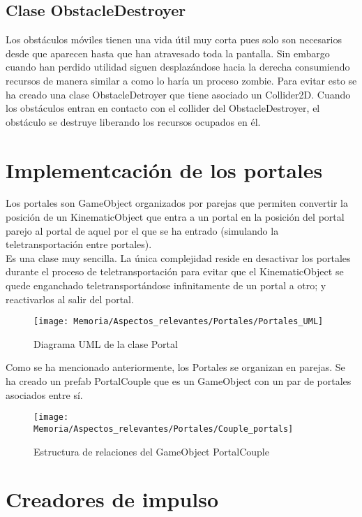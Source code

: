 \subsection{Clase ObstacleDestroyer}
Los obstáculos móviles tienen una vida útil muy corta pues solo son necesarios desde que aparecen hasta que han atravesado toda la pantalla. Sin embargo cuando han perdido utilidad siguen desplazándose hacia la derecha consumiendo recursos de manera similar a como lo haría un proceso zombie. Para evitar esto se ha creado una clase ObstacleDetroyer que tiene asociado un Collider2D. Cuando los obstáculos entran en contacto con el collider del ObstacleDestroyer, el obstáculo se destruye liberando los recursos ocupados en él.

\section{Implementcación de los portales}
Los portales son GameObject organizados por parejas que permiten convertir la posición de un KinematicObject que entra a un portal en la posición del portal parejo al portal de aquel por el que se ha entrado (simulando la teletransportación entre portales).\\
Es una clase muy sencilla. La única complejidad reside en desactivar los portales durante el proceso de teletransportación para evitar que el KinematicObject se quede enganchado teletransportándose infinitamente de un portal a otro; y reactivarlos al salir del portal.

\begin{figure}[h]
\centering
\texttt{[image: Memoria/Aspectos\_relevantes/Portales/Portales\_UML]}
\caption{Diagrama UML de la clase Portal}
\end{figure}

Como se ha mencionado anteriormente, los Portales se organizan en parejas. Se ha creado un prefab PortalCouple que es un GameObject con un par de portales asociados entre sí.

\begin{figure}[h]
\centering
\texttt{[image: Memoria/Aspectos\_relevantes/Portales/Couple\_portals]}
\caption{Estructura de relaciones del GameObject PortalCouple}
\end{figure}

\section{Creadores de impulso}

